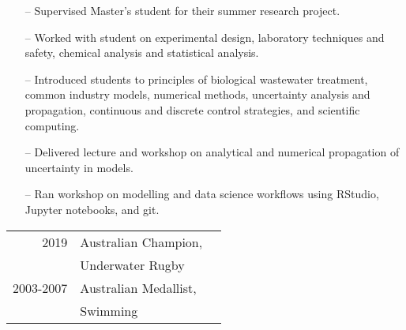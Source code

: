 \documentclass[10pt,a4paper]{altacv}
\begin{document}
\begin{itemize}
    \setlength{\itemindent}{0.5em}
    \item[--]   \small{Supervised Master's student for their summer research project.}
    \item[--]   \small{Worked with student on experimental design, laboratory techniques and safety, chemical analysis and statistical analysis.}
\end{itemize}
\divider\smallskip


\begin{itemize}
    \setlength{\itemindent}{0.5em}
    \item[--]   \small{Introduced students to principles of biological wastewater treatment, common industry models, numerical methods, uncertainty analysis and propagation, continuous and discrete control strategies, and scientific computing.}
\end{itemize}
\divider\smallskip

\begin{itemize}
    \setlength{\itemindent}{0.5em}
    \item[--]   \small{Delivered lecture and workshop on analytical and numerical propagation of uncertainty in models.}
    \item[--]   \small{Ran workshop on modelling and data science workflows using RStudio, Jupyter notebooks, and git.}
\end{itemize}




\begin{tabular}{rll}
2019 & Australian Champion, &\\
     &   Underwater Rugby   &   \\
2003-2007 & Australian Medallist, & \\
     &     Swimming & \\
\end{tabular}







\end{document}
